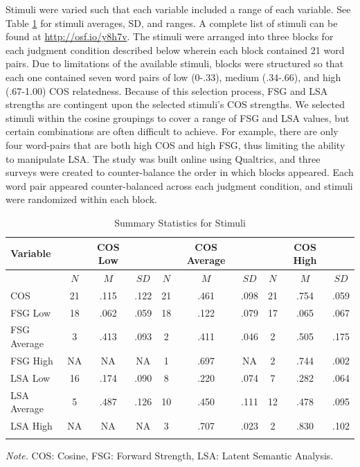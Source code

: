 \documentclass[english,man]{apa6}
\theoremstyle{definition}
\theoremstyle{definition}
\theoremstyle{definition}
\theoremstyle{remark}
\begin{document}
Stimuli were varied such that each variable included a range of each
variable. See Table \ref{tab:stim-table} for stimuli averages, SD, and
ranges. A complete list of stimuli can be found at
\url{http://osf.io/y8h7v}. The stimuli were arranged into three blocks
for each judgment condition described below wherein each block contained
21 word pairs. Due to limitations of the available stimuli, blocks were
structured so that each one contained seven word pairs of low (0-.33),
medium (.34-.66), and high (.67-1.00) COS relatedness. Because of this
selection process, FSG and LSA strengths are contingent upon the
selected stimuli's COS strengths. We selected stimuli within the cosine
groupings to cover a range of FSG and LSA values, but certain
combinations are often difficult to achieve. For example, there are only
four word-pairs that are both high COS and high FSG, thus limiting the
ability to manipulate LSA. The study was built online using Qualtrics,
and three surveys were created to counter-balance the order in which
blocks appeared. Each word pair appeared counter-balanced across each
judgment condition, and stimuli were randomized within each block.

\begin{table}[tbp]
\begin{center}
\begin{threeparttable}
\caption{\label{tab:stim-table}Summary Statistics for Stimuli}
\begin{tabular}{lccccccccc}
\toprule
Variable & \multicolumn{1}{c}{ } & \multicolumn{1}{c}{COS Low} & \multicolumn{1}{c}{ } & \multicolumn{1}{c}{ } & \multicolumn{1}{c}{COS Average} & \multicolumn{1}{c}{ } & \multicolumn{1}{c}{ } & \multicolumn{1}{c}{COS High} & \multicolumn{1}{c}{ }\\
\midrule
 & $N$ & $M$ & $SD$ & $N$ & $M$ & $SD$ & $N$ & $M$ & $SD$\\
COS & 21 & .115 & .122 & 21 & .461 & .098 & 21 & .754 & .059\\
FSG Low & 18 & .062 & .059 & 18 & .122 & .079 & 17 & .065 & .067\\
FSG Average & 3 & .413 & .093 & 2 & .411 & .046 & 2 & .505 & .175\\
FSG High & NA & NA & NA & 1 & .697 & NA & 2 & .744 & .002\\
LSA Low & 16 & .174 & .090 & 8 & .220 & .074 & 7 & .282 & .064\\
LSA Average & 5 & .487 & .126 & 10 & .450 & .111 & 12 & .478 & .095\\
LSA High & NA & NA & NA & 3 & .707 & .023 & 2 & .830 & .102\\
\bottomrule
\addlinespace
\end{tabular}
\begin{tablenotes}[para]
\textit{Note.} COS: Cosine, FSG: Forward Strength, LSA: Latent Semantic Analysis.
\end{tablenotes}
\end{threeparttable}
\end{center}
\end{table}
\end{document}
